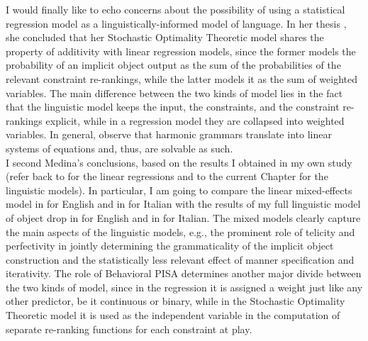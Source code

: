 I would finally like to echo  concerns about the possibility of using a statistical regression model as a linguistically-informed model of language. In her thesis \parencite[132-133]{Medina2007}, she concluded that her Stochastic Optimality Theoretic model shares the property of additivity with linear regression models, since the former models the probability of an implicit object output as the sum of the probabilities of the relevant constraint re-rankings, while the latter models it as the sum of weighted variables. The main difference between the two kinds of model lies in the fact that the linguistic model keeps the input, the constraints, and the constraint re-rankings explicit, while in a regression model they are collapsed into weighted variables. In general, \textcite{PaterEtAl2006} observe that harmonic grammars translate into linear systems of equations and, thus, are solvable as such.\\
I second Medina's conclusions, based on the results I obtained in my own study (refer back to  for the linear regressions and to the current Chapter for the linguistic models). In particular, I am going to compare the linear mixed-effects model in  for English and in  for Italian with the results of my full linguistic model of object drop in  for English and in  for Italian. The mixed models clearly capture the main aspects of the linguistic models, e.g., the prominent role of telicity and perfectivity in jointly determining the grammaticality of the implicit object construction and the statistically less relevant effect of manner specification and iterativity. The role of Behavioral PISA determines another major divide between the two kinds of model, since in the regression it is assigned a weight just like any other predictor, be it continuous or binary, while in the Stochastic Optimality Theoretic model it is used as the independent variable in the computation of separate re-ranking functions for each constraint at play.\\
